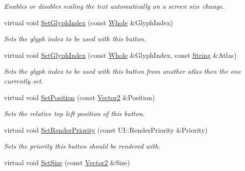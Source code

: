 \begin{DoxyCompactItemize}
\begin{DoxyCompactList}\small\item\em Enables or disables scaling the text automatically on a screen size change. \item\end{DoxyCompactList}\item 
virtual void \hyperlink{classphys_1_1UI_1_1TextButton_af421f9558333657e0d2d81c33fbf9eb3}{SetGlyphIndex} (const \hyperlink{namespacephys_a460f6bc24c8dd347b05e0366ae34f34a}{Whole} \&GlyphIndex)
\begin{DoxyCompactList}\small\item\em Sets the glyph index to be used with this button. \item\end{DoxyCompactList}\item 
virtual void \hyperlink{classphys_1_1UI_1_1TextButton_a731b313c31cea79f92180e18ab1ad783}{SetGlyphIndex} (const \hyperlink{namespacephys_a460f6bc24c8dd347b05e0366ae34f34a}{Whole} \&GlyphIndex, const \hyperlink{namespacephys_aa03900411993de7fbfec4789bc1d392e}{String} \&Atlas)
\begin{DoxyCompactList}\small\item\em Sets the glyph index to be used with this button from another atlas then the one currently set. \item\end{DoxyCompactList}\item 
virtual void \hyperlink{classphys_1_1UI_1_1TextButton_a52230b17c81743438bc0cd08eb49a5c5}{SetPosition} (const \hyperlink{classphys_1_1Vector2}{Vector2} \&Position)
\begin{DoxyCompactList}\small\item\em Sets the relative top left position of this button. \item\end{DoxyCompactList}\item 
virtual void \hyperlink{classphys_1_1UI_1_1TextButton_a60b433a61f163f275e3fd834d74d9092}{SetRenderPriority} (const UI::RenderPriority \&Priority)
\begin{DoxyCompactList}\small\item\em Sets the priority this button should be rendered with. \item\end{DoxyCompactList}\item 
virtual void \hyperlink{classphys_1_1UI_1_1TextButton_abceee9ffe1dd12e0e593a84f57d9b279}{SetSize} (const \hyperlink{classphys_1_1Vector2}{Vector2} \&Size)

\end{DoxyCompactItemize}
